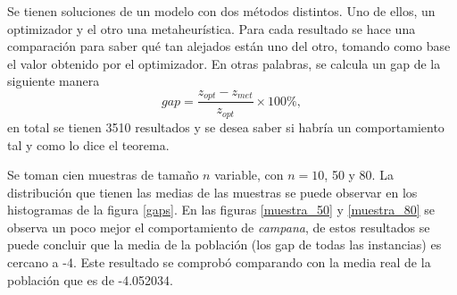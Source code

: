 \documentclass[12pt]{article}
\begin{document}
	Se tienen soluciones de un modelo con dos métodos distintos. Uno de ellos, un optimizador y el otro una metaheurística. Para cada resultado se hace una comparación para saber qué tan alejados están uno del otro, tomando como base el valor obtenido por el optimizador. En otras palabras, se calcula un gap de la siguiente manera
	\begin{equation*}
	gap = \frac{z_{opt} - z_{met}}{z_{opt}} \times 100 \%,
	\end{equation*}
	en total se tienen 3510 resultados y se desea saber si habría un comportamiento tal y como lo dice el teorema.
	
	Se toman cien muestras de tamaño $n$ variable, con $n=10$, 50 y 80. La distribución que tienen las medias de las muestras se puede observar en los histogramas de la figura \ref{gaps}. En las figuras \ref{muestra_50} y \ref{muestra_80} se observa un poco mejor el comportamiento de {\em campana}, de estos resultados se puede concluir que la media de la población (los gap de todas las instancias) es cercano a -4. Este resultado se comprobó comparando con la media real de la población que es de -4.052034.
	
\end{document}
